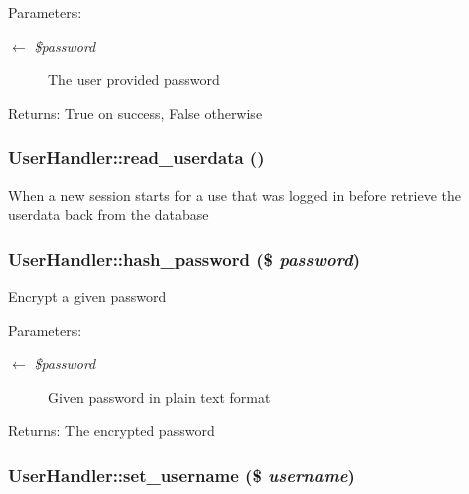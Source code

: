 \begin{Desc}
\item[Parameters:]
\begin{description}
\item[\mbox{$\leftarrow$} {\em \$password}]The user provided password \end{description}
\end{Desc}
\begin{Desc}
\item[Returns:]True on success, False otherwise \end{Desc}
\hypertarget{classUserHandler_4e9fb2f7763124ea84ebaf3b744d2d88}{
\subsubsection{\setlength{\rightskip}{0pt plus 5cm}UserHandler::read\_\-userdata ()}}
\label{classUserHandler_4e9fb2f7763124ea84ebaf3b744d2d88}


When a new session starts for a use that was logged in before retrieve the userdata back from the database \hypertarget{classUserHandler_6b2bbbdb4f1a08578c219a933880a1de}{
\subsubsection{\setlength{\rightskip}{0pt plus 5cm}UserHandler::hash\_\-password (\$ {\em password})}}
\label{classUserHandler_6b2bbbdb4f1a08578c219a933880a1de}


Encrypt a given password

\begin{Desc}
\item[Parameters:]
\begin{description}
\item[\mbox{$\leftarrow$} {\em \$password}]Given password in plain text format \end{description}
\end{Desc}
\begin{Desc}
\item[Returns:]The encrypted password \end{Desc}
\hypertarget{classUserHandler_fbcc9a275b547cca0bd4cff567b054a0}{
\subsubsection{\setlength{\rightskip}{0pt plus 5cm}UserHandler::set\_\-username (\$ {\em username})}}
\label{classUserHandler_fbcc9a275b547cca0bd4cff567b054a0}


